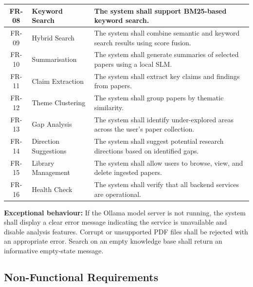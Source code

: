 \documentclass[12pt,a4paper]{article}
\begin{document}
\begin{longtable}{|c|p{3.5cm}|p{7.5cm}|}
    FR-08 & Keyword Search &
    The system shall support BM25-based keyword search. \\ \hline

    FR-09 & Hybrid Search &
    The system shall combine semantic and keyword search results using
    score fusion. \\ \hline

    FR-10 & Summarisation &
    The system shall generate summaries of selected papers using a
    local SLM. \\ \hline

    FR-11 & Claim Extraction &
    The system shall extract key claims and findings from papers. \\ \hline

    FR-12 & Theme Clustering &
    The system shall group papers by thematic similarity. \\ \hline

    FR-13 & Gap Analysis &
    The system shall identify under-explored areas across the user's
    paper collection. \\ \hline

    FR-14 & Direction Suggestions &
    The system shall suggest potential research directions based on
    identified gaps. \\ \hline

    FR-15 & Library Management &
    The system shall allow users to browse, view, and delete ingested
    papers. \\ \hline

    FR-16 & Health Check &
    The system shall verify that all backend services are operational. \\ \hline
\end{longtable}

\textbf{Exceptional behaviour:} If the Ollama model server is not running,
the system shall display a clear error message indicating the service is
unavailable and disable analysis features. Corrupt or unsupported PDF files
shall be rejected with an appropriate error. Search on an empty knowledge
base shall return an informative empty-state message.

\subsection{Non-Functional Requirements}
\end{document}

